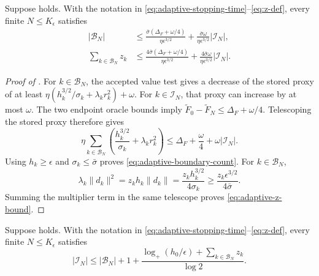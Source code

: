 \documentclass{article}
\begin{document}
\begin{lemma}\label{lem:boundary-count}
Suppose  holds.  With the notation in
\eqref{eq:adaptive-stopping-time}--\eqref{eq:z-def}, every finite
$N\le K_\epsilon$ satisfies
\begin{subequations}\label{eq:boundary-bounds}
\begin{align}
 |\mathcal B_N|
 &\le\frac{\bar\sigma(\Delta_F+\omega/4)}
           {\eta\epsilon^{3/2}}
  +\frac{\bar\sigma\omega}{\eta\epsilon^{3/2}}|\mathcal I_N|,
     \label{eq:adaptive-boundary-count}\\
 \sum_{k\in\mathcal B_N}z_k
 &\le\frac{4\bar\sigma(\Delta_F+\omega/4)}
           {\eta\epsilon^{3/2}}
  +\frac{4\bar\sigma\omega}{\eta\epsilon^{3/2}}|\mathcal I_N|.
     \label{eq:adaptive-z-bound}
\end{align}
\end{subequations}
\end{lemma}

\begin{proof}[Proof of ]
For $k\in\mathcal B_N$, the accepted value test gives a decrease of
the stored proxy of at least
$\eta(h_k^{3/2}/\sigma_k+\lambda_kr_k^2)+\omega$.
For $k\in\mathcal I_N$, that proxy can increase by at most $\omega$.
The two endpoint oracle bounds imply
$\widetilde F_0-\widetilde F_N\le\Delta_F+\omega/4$.
Telescoping the stored proxy therefore gives
\[
 \eta\sum_{k\in\mathcal B_N}
 \left(\frac{h_k^{3/2}}{\sigma_k}+\lambda_kr_k^2\right)
 \le\Delta_F+\frac\omega4+\omega|\mathcal I_N|.
\]
Using $h_k\ge\epsilon$ and $\sigma_k\le\bar\sigma$ proves
\eqref{eq:adaptive-boundary-count}.  For $k\in\mathcal B_N$,
\[
    \lambda_k\|d_k\|^2
    =z_k h_k\|d_k\|
    =\frac{z_k h_k^{3/2}}{4\sigma_k}
    \ge\frac{z_k\epsilon^{3/2}}{4\bar\sigma}.
\]
Summing the multiplier term in
the same telescope proves \eqref{eq:adaptive-z-bound}.
\end{proof}

\begin{lemma}\label{lem:interior-count}
Suppose  holds.  With the notation in
\eqref{eq:adaptive-stopping-time}--\eqref{eq:z-def}, every finite
$N\le K_\epsilon$ satisfies
\begin{equation}\label{eq:interior-count}
 |\mathcal I_N|\le |\mathcal B_N|+1+
 \frac{\log_+(h_0/\epsilon)+\sum_{k\in\mathcal B_N}z_k}{\log2}.
\end{equation}
\end{lemma}
\end{document}
